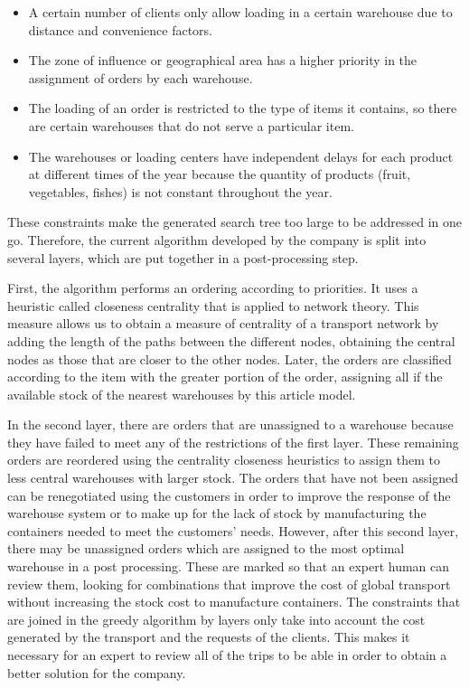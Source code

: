 \documentclass[letterpaper]{article} %
\begin{document}
\begin{itemize}
    \item A certain number of clients only allow loading in a certain warehouse due to distance and convenience factors.
    \item The zone of influence or geographical area has a higher priority in the assignment of orders by each warehouse.
    \item The loading of an order is restricted to the type of items it contains, so there are certain warehouses that do not serve a particular item.
    \item The warehouses or loading centers have independent delays for each product at different times of the year because the quantity of products (fruit, vegetables, fishes) is not constant throughout the year.
\end{itemize}

These constraints make the generated search tree too large to be addressed in one go. Therefore, the current algorithm developed by the company is split into several layers, which are put together in a post-processing step.

 First, the algorithm performs an ordering according to priorities. It uses a heuristic called closeness centrality that is applied to network theory. This measure allows us to obtain a measure of centrality of a transport network by adding the length of the paths between the different nodes, obtaining the central nodes as those that are closer to the other nodes. Later, the orders are classified according to the item with the greater portion of the order, assigning all if the available stock of the nearest warehouses by this article model.

In the second layer, there are orders that are unassigned to a warehouse because they have failed to meet any of the restrictions of the first layer. These remaining orders are reordered using the centrality closeness heuristics to assign them to less central warehouses with larger stock. The orders that have not been assigned can be renegotiated using the customers in order to improve the response of the warehouse system or to make up for the lack of stock by manufacturing the containers needed to meet the customers' needs. However, after this second layer, there may be unassigned orders which are assigned to the most optimal warehouse in a post processing. These are marked so that an expert human can review them, looking for combinations that improve the cost of global transport without increasing the stock cost to manufacture containers.
The constraints that are joined in the greedy algorithm by layers only take into account the cost generated by the transport and the requests of the clients. This makes it necessary for an expert to review all of the trips to be able in order to obtain a better solution for the company.
\end{document}
